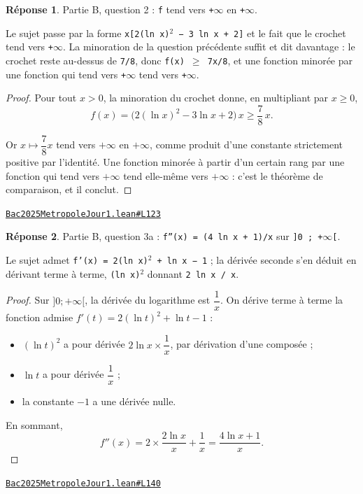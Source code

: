 \documentclass[11pt,a4paper]{article}
\theoremstyle{definition}
\theoremstyle{plain}
\theoremstyle{definition}
\newtheorem*{reponse}{Réponse}
\newcommand{\source}[2]{\par\smallskip\noindent\hfill{\footnotesize\href{#1}{\texttt{#2}}}\par\smallskip}
\begin{document}
\begin{reponse}
Partie B, question 2 : \texttt{f} tend vers \texttt{+\(\infty\)} en \texttt{+\(\infty\)}.

Le sujet passe par la forme \texttt{x[2(ln x)\(^{2}\) − 3 ln x + 2]} et le fait que le crochet tend
vers \texttt{+\(\infty\)}. La minoration de la question précédente suffit et dit davantage : le
crochet reste au-dessus de \texttt{7/8}, donc \texttt{f(x) \(\ge\) 7x/8}, et une fonction minorée par une
fonction qui tend vers \texttt{+\(\infty\)} tend vers \texttt{+\(\infty\)}.
\end{reponse}
\begin{proof}
Pour tout $x > 0$, la minoration du crochet donne, en multipliant par $x \ge 0$,
\[ f(x) = \bigl(2(\ln x)^2 - 3\ln x + 2\bigr) \, x \ge \frac{7}{8}\,x . \]

Or $x \mapsto \dfrac{7}{8}x$ tend vers $+\infty$ en $+\infty$, comme produit d'une
constante strictement positive par l'identité. Une fonction minorée à partir d'un certain
rang par une fonction qui tend vers $+\infty$ tend elle-même vers $+\infty$ : c'est le
théorème de comparaison, et il conclut.
\end{proof}
\source{https://github.com/Commutator-IO/learn-lean/blob/main/exams/2025/Bac2025MetropoleJour1.lean\#L123}{Bac2025MetropoleJour1.lean\#L123}

\begin{reponse}
Partie B, question 3a : \texttt{f''(x) = (4 ln x + 1)/x} sur \texttt{]0 ; +\(\infty\)[}.

Le sujet admet \texttt{f'(x) = 2(ln x)\(^{2}\) + ln x − 1} ; la dérivée seconde s'en déduit en
dérivant terme à terme, \texttt{(ln x)\(^{2}\)} donnant \texttt{2 ln x / x}.
\end{reponse}
\begin{proof}
Sur $]0 ; +\infty[$, la dérivée du logarithme est $\dfrac{1}{x}$. On dérive terme à
terme la fonction admise $f'(t) = 2(\ln t)^2 + \ln t - 1$ :

\begin{itemize}
\item $(\ln t)^2$ a pour dérivée $2 \ln x \times \dfrac{1}{x}$, par dérivation d'une
      composée ;
\item $\ln t$ a pour dérivée $\dfrac{1}{x}$ ;
\item la constante $-1$ a une dérivée nulle.
\end{itemize}

En sommant,
\[ f''(x) = 2 \times \frac{2 \ln x}{x} + \frac{1}{x}
   = \frac{4 \ln x + 1}{x} . \]
\end{proof}
\source{https://github.com/Commutator-IO/learn-lean/blob/main/exams/2025/Bac2025MetropoleJour1.lean\#L140}{Bac2025MetropoleJour1.lean\#L140}
\end{document}

